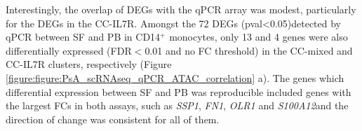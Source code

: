 Interestingly, the overlap of DEGs with the qPCR array was modest, particularly for the DEGs in the CC-IL7R. Amongst the 72 DEGs (pval<0.05)detected by qPCR between SF and PB in CD14$^+$ monocytes, only 13 and 4 genes were also differentially expressed (FDR$<$0.01 and no FC threshold) in the CC-mixed and CC-IL7R clusters, respectively (Figure \ref{figure:figure:PsA_scRNAseq_qPCR_ATAC_correlation} a). The genes which differential expression between SF and PB was reproducible included genes with the largest FCs in both assays, such as \textit{SSP1}, \textit{FN1}, \textit{OLR1} and \textit{S100A12}and the direction of change was consistent for all of them. %
   

